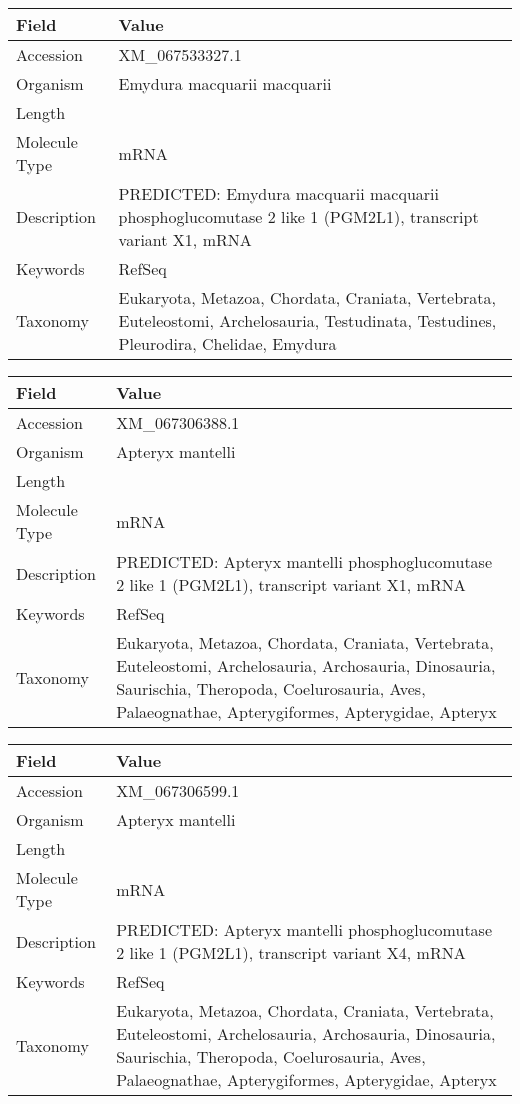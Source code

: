 \documentclass[10pt]{article}
\begin{document}
\vspace{1em}
{\footnotesize
\begin{longtable}{>{\raggedright\arraybackslash}p{4.5cm} >{\raggedright\arraybackslash}p{11.5cm}}
\textbf{Field} & \textbf{Value} \\
\hline
Accession & XM\_067533327.1 \\
Organism & Emydura macquarii macquarii \\
Length & 9001 \\
Molecule Type & mRNA \\
Description & PREDICTED: Emydura macquarii macquarii phosphoglucomutase 2 like 1 (PGM2L1), transcript variant X1, mRNA \\
Keywords & RefSeq \\
Taxonomy & Eukaryota, Metazoa, Chordata, Craniata, Vertebrata, Euteleostomi, Archelosauria, Testudinata, Testudines, Pleurodira, Chelidae, Emydura \\
\end{longtable}
}

\vspace{1em}
{\footnotesize
\begin{longtable}{>{\raggedright\arraybackslash}p{4.5cm} >{\raggedright\arraybackslash}p{11.5cm}}
\textbf{Field} & \textbf{Value} \\
\hline
Accession & XM\_067306388.1 \\
Organism & Apteryx mantelli \\
Length & 6489 \\
Molecule Type & mRNA \\
Description & PREDICTED: Apteryx mantelli phosphoglucomutase 2 like 1 (PGM2L1), transcript variant X1, mRNA \\
Keywords & RefSeq \\
Taxonomy & Eukaryota, Metazoa, Chordata, Craniata, Vertebrata, Euteleostomi, Archelosauria, Archosauria, Dinosauria, Saurischia, Theropoda, Coelurosauria, Aves, Palaeognathae, Apterygiformes, Apterygidae, Apteryx \\
\end{longtable}
}

\vspace{1em}
{\footnotesize
\begin{longtable}{>{\raggedright\arraybackslash}p{4.5cm} >{\raggedright\arraybackslash}p{11.5cm}}
\textbf{Field} & \textbf{Value} \\
\hline
Accession & XM\_067306599.1 \\
Organism & Apteryx mantelli \\
Length & 6288 \\
Molecule Type & mRNA \\
Description & PREDICTED: Apteryx mantelli phosphoglucomutase 2 like 1 (PGM2L1), transcript variant X4, mRNA \\
Keywords & RefSeq \\
Taxonomy & Eukaryota, Metazoa, Chordata, Craniata, Vertebrata, Euteleostomi, Archelosauria, Archosauria, Dinosauria, Saurischia, Theropoda, Coelurosauria, Aves, Palaeognathae, Apterygiformes, Apterygidae, Apteryx \\
\end{longtable}
}
\end{document}
